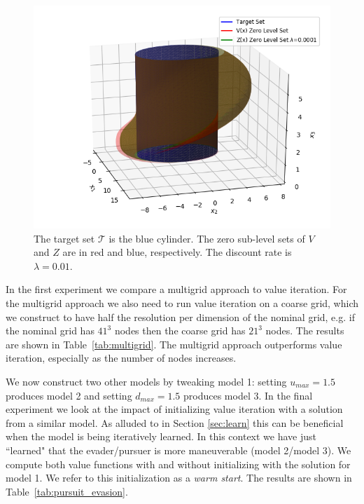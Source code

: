 \begin{figure}
\includegraphics[trim= 2.5cm 0cm 0cm 0.5cm, clip=true,scale=0.65]{air_3D.png}
\caption{The target set $\mathcal{T}$ is the blue cylinder. The zero sub-level sets of $V$ and $Z$ are in red and blue, respectively. The discount rate is $\lambda=0.01$.}
\label{fig:air3D}
\end{figure}

In the first experiment we compare a multigrid approach{} to value iteration. For the multigrid approach we also need to run value iteration on a coarse grid, which we construct to have half the resolution per dimension of the nominal grid, e.g. if the nominal grid has $41^3$ nodes then the coarse grid has $21^3$ nodes. The results are shown in Table~\ref{tab:multigrid}. The multigrid approach outperforms value iteration, especially as the number of nodes increases.

We now construct two other models by tweaking model 1: setting $u_{max}=1.5$ produces model 2 and setting $d_{max}=1.5$ produces model 3. In the final experiment we look at the impact of initializing value iteration with a solution from a similar model. As alluded to in Section \ref{sec:learn} this can be beneficial when the model is being iteratively learned. In this context we have just ``learned" that the evader/pursuer is more maneuverable (model 2/model 3). We compute both value functions with and without initializing with the solution for model 1. We refer to this initialization as a \emph{warm start}. The results are shown in Table~\ref{tab:pursuit_evasion}.

